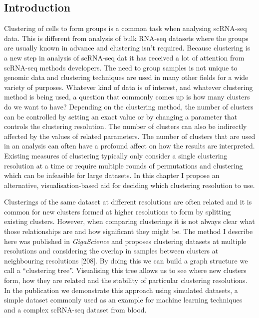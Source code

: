 \documentclass[11pt,a4paper,titlepage,twoside,openright]{style/unimelbthesis}
\theoremstyle{definition}
\theoremstyle{definition}
\theoremstyle{definition}
\theoremstyle{remark}
\begin{document}
\begin{mainmatter}
\clearpage

\hypertarget{introduction-3}{%
\section{Introduction}\label{introduction-3}}

Clustering of cells to form groups is a common task when analysing scRNA-seq data. This is different from analysis of bulk RNA-seq datasets where the groups are usually known in advance and clustering isn't required. Because clustering is a new step in analysis of scRNA-seq dat it has received a lot of attention from scRNA-seq methods developers. The need to group samples is not unique to genomic data and clustering techniques are used in many other fields for a wide variety of purposes. Whatever kind of data is of interest, and whatever clustering method is being used, a question that commonly comes up is how many clusters do we want to have? Depending on the clustering method, the number of clusters can be controlled by setting an exact value or by changing a parameter that controls the clustering resolution. The number of clusters can also be indirectly affected by the values of related parameters. The number of clusters that are used in an analysis can often have a profound affect on how the results are interpreted. Existing measures of clustering typically only consider a single clustering resolution at a time or require multiple rounds of permutations and clustering which can be infeasible for large datasets. In this chapter I propose an alternative, visualisation-based aid for deciding which clustering resolution to use.

Clusterings of the same dataset at different resolutions are often related and it is common for new clusters formed at higher resolutions to form by splitting existing clusters. However, when comparing clusterings it is not always clear what those relationships are and how significant they might be. The method I describe here was published in \emph{GigaScience} and proposes clustering datasets at multiple resolutions and considering the overlap in samples between clusters at neighbouring resolutions {[}208{]}. By doing this we can build a graph structure we call a \enquote{clustering tree}. Visualising this tree allows us to see where new clusters form, how they are related and the stability of particular clustering resolutions. In the publication we demonstrate this approach using simulated datasets, a simple dataset commonly used as an example for machine learning techniques and a complex scRNA-seq dataset from blood.


\end{mainmatter}
\end{document}
